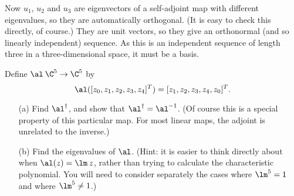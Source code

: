 \begin{solution}
\begin{itemize}
   Now $u_1$, $u_2$ and $u_3$ are eigenvectors of a self-adjoint
   map with different eigenvalues, so they are automatically
   orthogonal.  (It is easy to check this directly, of course.)  They
   are unit vectors, so they give an orthonormal (and so linearly
   independent) sequence.  As this is an independent sequence of
   length three in a three-dimensional space, it must be a basis.
 \end{itemize}
\end{solution}

\begin{exercise}
 Define $\al\:\C^5\to\C^5$ by 
 \[ \al([z_0,z_1,z_2,z_3,z_4]^T) = [z_1,z_2,z_3,z_4,z_0]^T. \]
 \begin{itemize}
  \item[(a)] Find $\al^\dag$, and show that $\al^\dag=\al^{-1}$.
   (Of course this is a special property of this particular map.  For
   most linear maps, the adjoint is unrelated to the inverse.)
  \item[(b)] Find the eigenvalues of $\al$.  (Hint: it is easier to
   think directly about when $\al(z)=\lm\,z$, rather than trying to
   calculate the characteristic polynomial.  You will need to consider
   separately the cases where $\lm^5=1$ and where $\lm^5\neq 1$.)
 \end{itemize}
\end{exercise}
